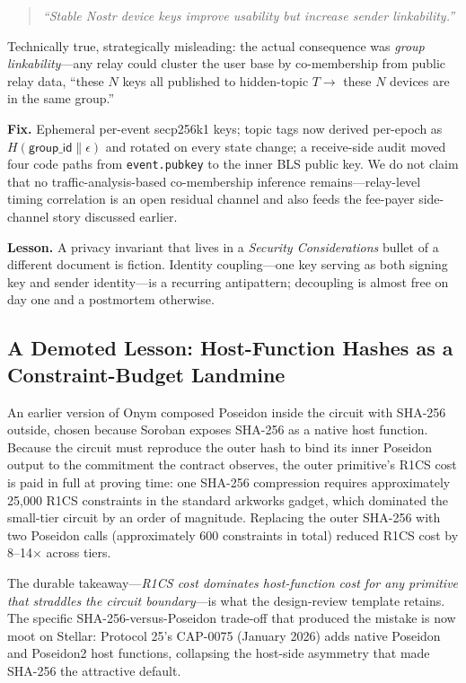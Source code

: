 \documentclass{IEEEcsmag}
\begin{document}
\begin{quote}
\emph{``Stable Nostr device keys improve usability but increase sender linkability.''}
\end{quote}

Technically true, strategically misleading: the actual consequence was \emph{group linkability}---any relay could cluster the user base by co-membership from public relay data, ``these $N$ keys all published to hidden-topic $T \to$ these $N$ devices are in the same group.''

\textbf{Fix.} Ephemeral per-event secp256k1 keys; topic tags now derived per-epoch as $H(\mathsf{group\_id} \mathbin\| \epsilon)$ and rotated on every state change; a receive-side audit moved four code paths from \texttt{event.pubkey} to the inner BLS public key. We do not claim that no traffic-analysis-based co-membership inference remains---relay-level timing correlation is an open residual channel and also feeds the fee-payer side-channel story discussed earlier.

\textbf{Lesson.} A privacy invariant that lives in a \emph{Security Considerations} bullet of a different document is fiction. Identity coupling---one key serving as both signing key and sender identity---is a recurring antipattern; decoupling is almost free on day one and a postmortem otherwise.

\subsection{A Demoted Lesson: Host-Function Hashes as a Constraint-Budget Landmine}

An earlier version of Onym composed Poseidon inside the circuit with SHA-256 outside, chosen because Soroban exposes SHA-256 as a native host function. Because the circuit must reproduce the outer hash to bind its inner Poseidon output to the commitment the contract observes, the outer primitive's R1CS cost is paid in full at proving time: one SHA-256 compression requires approximately 25{,}000 R1CS constraints in the standard arkworks gadget, which dominated the small-tier circuit by an order of magnitude. Replacing the outer SHA-256 with two Poseidon calls (approximately 600 constraints in total) reduced R1CS cost by 8--14$\times$ across tiers.

The durable takeaway---\emph{R1CS cost dominates host-function cost for any primitive that straddles the circuit boundary}---is what the design-review template retains. The specific SHA-256-versus-Poseidon trade-off that produced the mistake is now moot on Stellar: Protocol 25's CAP-0075 (January 2026) adds native Poseidon and Poseidon2 host functions, collapsing the host-side asymmetry that made SHA-256 the attractive default.
\end{document}
